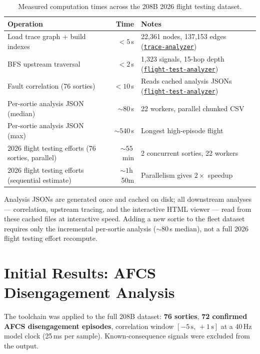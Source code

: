 \documentclass[11pt, letterpaper]{article}
\newcommand{\repoFTA}{\href{https://github.com/francis-barchesky/flight-test-analyzer}{\texttt{flight-test-analyzer}}}
\newcommand{\repoTrace}{\href{https://github.com/francis-barchesky/trace-analyzer}{\texttt{trace-analyzer}}}
\begin{document}
\begin{table}[h]
\centering
\caption{Measured computation times across the 208B 2026 flight testing dataset.}
\label{tab:perf}
\begin{tabularx}{\textwidth}{@{}l r X@{}}
\toprule
\textbf{Operation} & \textbf{Time} & \textbf{Notes} \\
\midrule
Load trace graph + build indexes  & $< 5$\,s       & 22{,}361 nodes, 137{,}153 edges (\repoTrace{}) \\
BFS upstream traversal            & $< 2$\,s       & 1{,}323 signals, 15-hop depth (\repoFTA{}) \\
Fault correlation (76 sorties)    & $< 10$\,s      & Reads cached analysis JSONs (\repoFTA{}) \\
\midrule
Per-sortie analysis JSON (median) & $\sim\!80$\,s  & 22 workers, parallel chunked CSV \\
Per-sortie analysis JSON (max)    & $\sim\!540$\,s & Longest high-episode flight \\
2026 flight testing efforts (76 sorties, parallel) & $\sim\!55$\,min & 2 concurrent sorties, 22 workers \\
2026 flight testing efforts (sequential estimate)  & $\sim\!1$h\,50m & Parallelism gives $2\times$ speedup \\
\bottomrule
\end{tabularx}
\end{table}

Analysis JSONs are generated once and cached on disk; all downstream
analyses --- correlation, upstream tracing, and the interactive HTML viewer ---
read from these cached files at interactive speed. Adding a new sortie to the
fleet dataset requires only the incremental per-sortie analysis ($\sim\!80$\,s
median), not a full 2026 flight testing effort recompute.

\section{Initial Results: AFCS Disengagement Analysis}

The toolchain was applied to the full 208B dataset: \textbf{76 sorties},
\textbf{72 confirmed AFCS disengagement episodes}, correlation window
$[-5\,\text{s},\, +1\,\text{s}]$ at a 40\,Hz model clock (25\,ms per sample).
Known-consequence signals were excluded from the output.
\end{document}
